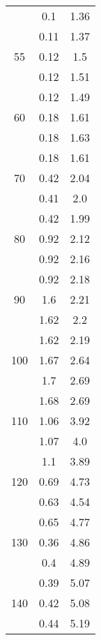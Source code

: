 \begin{table}[H]
\begin{tabular}{S[table-format = 2.0] S S}
		                 & 0.1       & 1.36      \\
		                 & 0.11      & 1.37      \\
		55               & 0.12      & 1.5       \\
		                 & 0.12      & 1.51      \\
		                 & 0.12      & 1.49      \\
		60               & 0.18      & 1.61      \\
		                 & 0.18      & 1.63      \\
		                 & 0.18      & 1.61      \\
		70               & 0.42      & 2.04      \\
		                 & 0.41      & 2.0       \\
		                 & 0.42      & 1.99      \\
		80               & 0.92      & 2.12      \\
		                 & 0.92      & 2.16      \\
		                 & 0.92      & 2.18      \\
		90               & 1.6       & 2.21      \\
		                 & 1.62      & 2.2       \\
		                 & 1.62      & 2.19      \\
		100              & 1.67      & 2.64      \\
		                 & 1.7       & 2.69      \\
		                 & 1.68      & 2.69      \\
		110              & 1.06      & 3.92      \\
		                 & 1.07      & 4.0       \\
		                 & 1.1       & 3.89      \\
		120              & 0.69      & 4.73      \\
		                 & 0.63      & 4.54      \\
		                 & 0.65      & 4.77      \\
		130              & 0.36      & 4.86      \\
		                 & 0.4       & 4.89      \\
		                 & 0.39      & 5.07      \\
		140              & 0.42      & 5.08      \\
		                 & 0.44      & 5.19      \\

\end{tabular}
\end{table}
